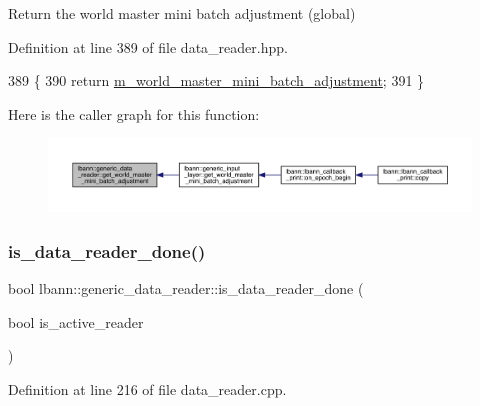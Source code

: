 Return the world master mini batch adjustment (global) 



Definition at line 389 of file data\+\_\+reader.\+hpp.


\begin{DoxyCode}
389                                                      \{
390     \textcolor{keywordflow}{return} \hyperlink{classlbann_1_1generic__data__reader_acd33b2dbdfd4043ecc62cc13789532a2}{m\_world\_master\_mini\_batch\_adjustment};
391   \}
\end{DoxyCode}
Here is the caller graph for this function\+:\nopagebreak
\begin{figure}[H]
\begin{center}
\leavevmode
\includegraphics[width=350pt]{classlbann_1_1generic__data__reader_a0d0f7d684970b5cc59c63050555df302_icgraph}
\end{center}
\end{figure}
\mbox{\label{classlbann_1_1generic__data__reader_a8640edf9c71e3b7bee8a8e947c4690fa}} 
\subsubsection{\texorpdfstring{is\+\_\+data\+\_\+reader\+\_\+done()}{is\_data\_reader\_done()}}
{\footnotesize\ttfamily bool lbann\+::generic\+\_\+data\+\_\+reader\+::is\+\_\+data\+\_\+reader\+\_\+done (\begin{DoxyParamCaption}\item[{bool}]{is\+\_\+active\+\_\+reader }\end{DoxyParamCaption})}



Definition at line 216 of file data\+\_\+reader.\+cpp.


